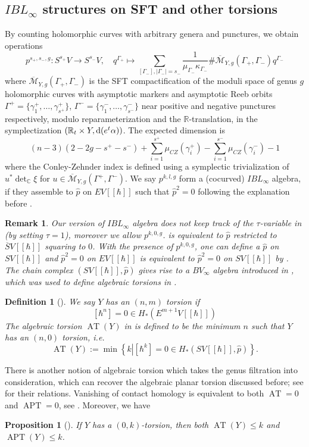 \documentclass[11pt]{amsart}
\numberwithin{equation}{section}
\newtheorem{definition}[theorem]{\textbf{Definition}}
\newtheorem{proposition}[theorem]{\textbf{Proposition}}
\newtheorem{remark}[theorem]{\textbf{Remark}}
\def\R{\mathbb{R}}
\def\C{{\mathbb C}}
\def\cM{{\mathcal M}}
\def\rd{{\rm d}}
\DeclareMathOperator{\APT}{APT}
\DeclareMathOperator{\AT}{AT}
\begin{document}
\subsection{$IBL_\infty$ structures on SFT and other torsions}
By counting holomorphic curves with arbitrary genera and punctures, we obtain operations
$$p^{s_+,s_-,g}:S^{s_+}V\to S^{s_-}V, \quad q^{\Gamma_+} \mapsto \sum_{[\Gamma_-],|\Gamma_-|=s_-} \frac{1}{\mu_{\Gamma_-}\kappa_{\Gamma_-}}\#\overline{\cM}_{Y,g}(\Gamma_+,\Gamma_-)q^{\Gamma_-} $$
where $\overline{\cM}_{Y,g}(\Gamma_+,\Gamma_-)$ is the SFT compactification of the moduli space of genus $g$ holomorphic curves with asymptotic markers and asymptotic Reeb orbits $\Gamma^+=\{\gamma_1^+,\ldots,\gamma_{s^+}^+ \}$, $\Gamma^-=\{\gamma_1^-,\ldots,\gamma_{s^-}^- \}$ near positive and negative punctures respectively, modulo reparameterization and the $\R$-translation, in the symplectization $(\R_t\times Y, \rd(e^t\alpha))$. The expected dimension is 
$$(n-3)(2-2g-s^+-s^-)+\sum_{i=1}^{s^+}\mu_{CZ}(\gamma_i^+) - \sum_{i=1}^{s^-}\mu_{CZ}(\gamma_i^-)-1$$
where the Conley-Zehnder index is defined using a symplectic trivialization of $u^*\det_{\C}\xi$ for $u\in \overline{\cM}_{Y,g}(\Gamma^+,\Gamma^-)$. We say $p^{k,l,g}$ form a (cocurved) $IBL_\infty$ algebra, if they assemble to $\widehat{p}$ on $EV[[\hbar]]$ such that $\widehat{p}^2=0$ following the explanation before \cite[Definition 5.9]{moreno2024rsft}.
\begin{remark}
    Our version of $IBL_\infty$ algebra does not keep track of the $\tau$-variable in \cite[Definition 2.3]{CFL} (by setting $\tau=1$), moreover we allow $p^{k,0,g}$. \cite[Definition 2.3]{CFL} is equivalent to $\widehat{p}$ restricted to $\overline{S}V[[\hbar]]$ squaring to $0$. With the presence of  $p^{k,0,g}$, one can define a $\widehat{p}$ on $SV[[\hbar]]$ and $\widehat{p}^2=0$ on $EV[[\hbar]]$ is equivalent to $\widehat{p}^2=0$ on $SV[[\hbar]]$  by \cite[Proposition 5.13]{moreno2024rsft}. The chain complex $(SV[[\hbar]],\widehat{p})$ gives rise to a $BV_\infty$ algebra introduced in \cite{CL:string}, which was used to define algebraic torsions in \cite{LW}. 
\end{remark}

\begin{definition}[{\cite[Definition 5.17]{moreno2024rsft}}]
    We say $Y$ has an $(n,m)$ torsion if 
    $$[\hbar^n]=0\in H_*(E^{m+1}V[[\hbar]])$$
    The algebraic torsion $\AT(Y)$ in \cite{LW} is defined to be the minimum $n$ such that $Y$ has an $(n,0)$ torsion, i.e.
    $$\AT(Y):=\min\left\{k \left| [\hbar^k]=0 \in H_*(SV[[\hbar]],\widehat{p}) \right.\right\}.$$
\end{definition}
There is another notion of algebraic torsion which takes the genus filtration into consideration, which can recover the algebraic planar torsion discussed before; see \cite[\S 5.2.2]{moreno2024rsft} for their relations. Vanishing of contact homology is equivalent to both $\AT=0$ and $\APT=0$, see \cite{zbMATH05658836,LW,moreno2024landscape}. Moreover, we have 
\begin{proposition}[{\cite[Proposition 5.21]{moreno2024rsft}}]\label{prop:0-k}
    If $Y$ has a $(0,k)$-torsion, then both $\AT(Y)\le k$ and $\APT(Y)\le k$.
\end{proposition}
\end{document}
